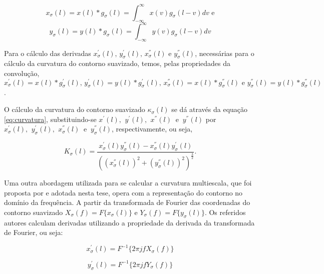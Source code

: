 \begin{equation}
x_{\sigma}(l) = x(l) * g_{\sigma}(l) = \int^{\infty}_{-\infty}{x(v)g_{\sigma}(l-v)}dv \text{ e}
\end{equation}
\begin{equation}
y_{\sigma}(l) = y(l) * g_{\sigma}(l)=\int^{\infty}_{-\infty}{y(v)g_{\sigma}(l-v)}dv
\end{equation}

Para o cálculo das derivadas $x^{'}_{\sigma}(l)\text{, }y^{'}_{\sigma}(l)\text{, }x^{''}_{\sigma}(l) \text{ e }y^{''}_{\sigma}(l)$, necessárias para o cálculo da curvatura do contorno suavizado, temos, pelas propriedades da convolução, $x^{'}_{\sigma}(l) = x(l) * g^{'}_{\sigma}(l)\text{, }y^{'}_{\sigma}(l) = y(l) * g^{'}_{\sigma}(l)\text{, }x^{''}_{\sigma}(l) = x(l) * g^{''}_{\sigma}(l)\text{ e }
y^{''}_{\sigma}(l) = y(l) * g^{''}_{\sigma}(l)$.

O cálculo da curvatura do contorno suavizado $\kappa_{\sigma}(l)$ se dá através da equação \ref{eq:curvatura}, substituindo-se $x^{'}(l)\text{, }\:y^{'}(l)\text{, }\:x^{''}(l)\:\text{ e }\:y^{''}(l)$ por $x^{'}_{\sigma}(l)\text{, }\:y^{'}_{\sigma}(l)\text{, }\:x^{''}_{\sigma}(l)\:\text{ e }\:y^{''}_{\sigma}(l)$, respectivamente, ou seja,

\begin{equation} \label{eq:curvatura_ms}
K_{\sigma}(l) = \frac{x_{\sigma}^{'}(l)y_{\sigma}^{''}(l)-x_{\sigma}^{''}(l)y_{\sigma}^{'}(l)}{((x_{\sigma}^{''}(l))^{2}+(y_{\sigma}^{''}(l))^{2})^{\frac{3}{2}}}\text{.}
\end{equation}

Uma outra abordagem utilizada para se calcular a curvatura multiescala, que foi proposta por  e adotada nesta tese, opera com a representação do contorno no domínio da frequência. A partir da transformada de Fourier das coordenadas do contorno suavizado $X_{\sigma}(f) = F\big\{x_{\sigma}(l)\big\}$ e $Y_{\sigma}(f) = F\big\{y_{\sigma}(l)\big\}$. Os referidos autores calculam derivadas utilizando a propriedade da derivada da transformada de Fourier, ou seja:

\begin{equation}
x_{\sigma}^{'}(l) = F^{-1}\big\{2 \pi j f  X_{\sigma}(f)\big\}
\end{equation}

\begin{equation}
y_{\sigma}^{'}(l) = F^{-1}\big\{2 \pi j f  Y_{\sigma}(f)\big\}
\end{equation}


